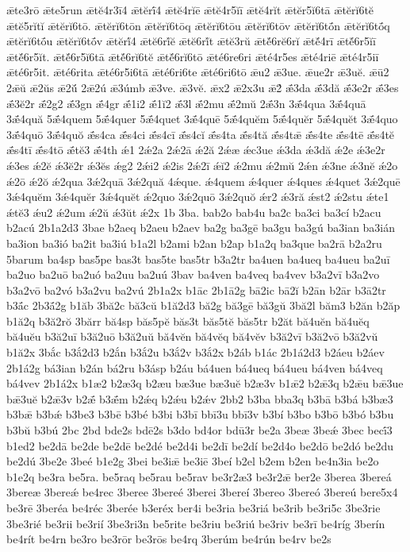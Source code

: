 {ǣte3rō
ǣte5run
ǣtĕ4r3ī4
ǣtĕrī́4
ǣtĕ4rĭē
ǣtĕ4r5ĭī
ǣtĕ4rĭt
ǣtĕr5ĭ6tā
ǣtĕrĭ6tĕ
ǣtĕ5rĭtĭ
ǣtĕrĭ6tō.
ǣtĕrĭ6tōn
ǣtĕrĭ6tōq
ǣtĕrĭ6tōu
ǣtĕrĭ6tōv
ǣtĕrĭ6tṓn
ǣtĕrĭ6tṓq
ǣtĕrĭ6tṓu
ǣtĕrĭ6tṓv
ǣtĕrĭ́4
ǣtĕ6rĭ́ĕ
ǣtĕ6rĭ́t
ǣtĕ3rŭ
ǣtĕ́6rĕ6rĭ
ǣtĕ́4rī
ǣtĕ́6r5ĭī
ǣtĕ́6r5ĭt.
ǣtĕ́6r5ĭ6tā
ǣtĕ́6rĭ6tĕ
ǣtĕ́6rĭ6tō
ǣté6re6ri
ǣté4r5es
ǣté4riē
ǣté4r5iī
ǣté6r5it.
ǣté6rita
ǣté6r5i6tā
ǣté6ri6te
ǣté6ri6tō
ǣu2
ǣ3ue.
ǣue2r
ǣ3uĕ.
ǣū2
2ǣŭ
ǣ2ŭs
ǣ2ŭ́
2ǣ2ú
ǣ3úmb
ǣ3ve.
ǣ3vĕ.
ǣx2
ǣ2x3u
ǣ2́
ǣ́3da
ǣ́3dă
ǣ́3e2r
ǣ́3es
ǣ́3ĕ2r
ǣ́2g2
ǣ́3gn
ǣ́4gr
ǣ́1i2
ǣ́1ĭ2
ǣ́3l
ǣ́2mu
ǣ́2mŭ
2ǣ́3n
3ǣ́4qua
3ǣ́4quā
3ǣ́4quă
5ǣ́4quem
5ǣ́4quer
5ǣ́4quet
3ǣ́4quē
5ǣ́4quĕm
5ǣ́4quĕr
5ǣ́4quĕt
3ǣ́4quo
3ǣ́4quō
3ǣ́4quŏ
ǣ́s4ca
ǣ́s4ci
ǣ́s4cī
ǣ́s4cĭ
ǣ́s4ta
ǣ́s4tă
ǣ́s4tǣ
ǣ́s4te
ǣ́s4tē
ǣ́s4tĕ
ǣ́s4tī
ǣ́s4tō
ǣ́tĕ3
ǣ́4th
ǽ1
2ǽ2a
2ǽ2ā
ǽ2ă
2ǽæ
ǽc3ue
ǽ3da
ǽ3dă
ǽ2e
ǽ3e2r
ǽ3es
ǽ2ĕ
ǽ3ĕ2r
ǽ3ĕs
ǽg2
2ǽi2
ǽ2is
2ǽ2ī
ǽĭ2
ǽ2mu
ǽ2mŭ
2ǽn
ǽ3ne
ǽ3nĕ
ǽ2o
ǽ2ō
ǽ2ŏ
ǽ2qua
3ǽ2quā
3ǽ2quă
4ǽque.
ǽ4quem
ǽ4quer
ǽ4ques
ǽ4quet
3ǽ2quē
3ǽ4quĕm
3ǽ4quĕr
3ǽ4quĕt
ǽ2quo
3ǽ2quō
3ǽ2quŏ
ǽr2
ǽ3ră
ǽst2
ǽ2stu
ǽte1
ǽtĕ3
ǽu2
ǽ2um
ǽ2ŭ
ǽ3ŭt
ǽ2x
1b
3ba.
bab2o
bab4u
ba2c
ba3ci
ba3cí
b2acu
b2acú
2b1a2d3
3bae
b2aeq
b2aeu
b2aev
ba2g
ba3gē
ba3gu
ba3gú
ba3ian
ba3ián
ba3ion
ba3ió
ba2it
ba3iú
b1a2l
b2ami
b2an
b2ap
b1a2q
ba3que
ba2rā
b2a2ru
5barum
ba4sp
bas5pe
bas3t
bas5te
bas5tr
b3a2tr
ba4uen
ba4ueq
ba4ueu
ba2uī
ba2uo
ba2uō
ba2uó
ba2uu
ba2uú
3bav
ba4ven
ba4veq
ba4vev
b3a2vī
b3a2vo
b3a2vō
ba2vó
b3a2vu
ba2vú
2b1a2x
b1āc
2b1ā2g
bā2ic
bā2ĭ
b2ān
b2ār
b3ā2tr
b3ā́c
2b3ā́2g
b1ăb
3bă2c
bă3cŭ
b1ă2d3
bă2g
bă3gē
bă3gŭ
3bă2l
băm3
b2ăn
b2ăp
b1ă2q
b3ă2rŏ
3bărr
bă4sp
băs5pĕ
băs3t
băs5tĕ
băs5tr
b2ăt
bă4uĕn
bă4uĕq
bă4uĕu
b3ă2uī
b3ă2uō
b3ă2uŭ
bă4vĕn
bă4vĕq
bă4vĕv
b3ă2vī
b3ă2vō
b3ă2vŭ
b1ă2x
3bắc
b3ắ2d3
b2ắn
b3ắ2u
b3ắ2v
b3ắ2x
b2áb
b1ác
2b1á2d3
b2áeu
b2áev
2b1á2g
bá3ian
b2án
bá2ru
b3ásp
b2áu
bá4uen
bá4ueq
bá4ueu
bá4ven
bá4veq
bá4vev
2b1á2x
b1æ2
b2æ3q
b2æu
bæ3ue
bæ3uĕ
b2æ3v
b1ǣ2
b2ǣ3q
b2ǣu
bǣ3ue
bǣ3uĕ
b2ǣ3v
b2ǣ́
b3ǣ́m
b2ǽq
b2ǽu
b2ǽv
2bb2
b3ba
bba3q
b3bā
b3bá
b3bæ3
b3bǣ
b3bǽ
b3be3
b3bē
b3bé
b3bi
b3bī
bbī3u
bbī3v
b3bí
b3bo
b3bō
b3bó
b3bu
b3bŭ
b3bú
2bc
2bd
bde2s
bdē2s
b3do
bd4or
bdū3r
be2a
3beæ
3beǽ
3bec
becī́3
b1ed2
be2dā
be2de
be2dē
be2dé
be2d4i
be2dī
be2dí
be2d4o
be2dō
be2dó
be2du
be2dú
3be2e
3beé
b1e2g
3bei
be3iǣ
be3iē
3beí
b2el
b2em
b2en
be4n3ia
be2o
b1e2q
be3ra
be5ra.
be5raq
be5rau
be5rav
be3r2æ3
be3r2ǣ
ber2e
3berea
3bereá
3bereæ
3bereǽ
be4rec
3beree
3bereé
3berei
3bereí
3bereo
3bereó
3bereú
bere5x4
be3rē
3beréa
be4réc
3berée
b3eréx
ber4i
be3ria
be3riá
be3rib
be3ri5c
3be3rie
3be3rié
be3rii
be3rií
3be3ri3n
be5rite
be3riu
be3riú
be3riv
be3rī
be4ríg
3berín
be4rít
be4rn
be3ro
be3rōr
be3rōs
be4rq
3berúm
be4rún
be4rv
be2s
}
